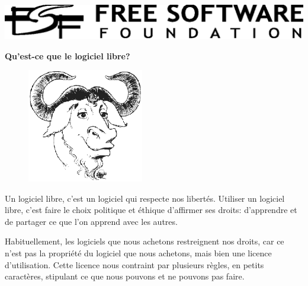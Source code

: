 \documentclass[12pt]{article}
\begin{document}
\begin{center}

\includegraphics{fsf-logo.eps}

\vspace{0.3in}

{\Huge\bf Qu'est-ce que le logiciel libre?}

\end{center}

\begin{figure}
 \begin{center}
   \includegraphics[width=2in]{gnu-head.eps}
 \end{center}
\end{figure}

Un logiciel libre, c'est un logiciel qui respecte nos libertés. Utiliser un
logiciel libre, c'est faire le choix politique et éthique d'affirmer ses
droits: d'apprendre et de partager ce que l'on apprend avec les autres.


Habituellement, les logiciels que nous achetons restreignent nos droits, car ce
n'est pas la propriété du logiciel que nous achetons, mais bien une licence
d'utilisation. Cette licence nous contraint par plusieurs règles, en petits
caractères, stipulant ce que nous pouvons et ne pouvons pas faire.

\end{document}
